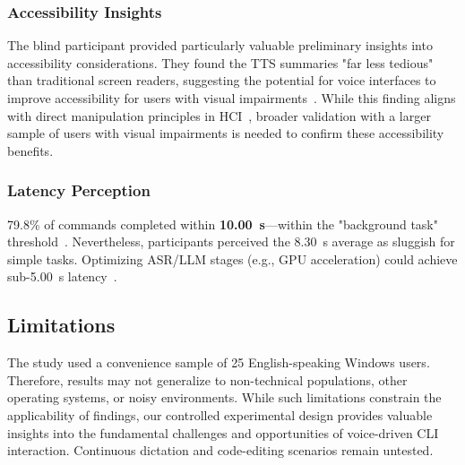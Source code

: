 \documentclass[a4paper,12pt]{article}
\begin{document}
\subsubsection{Accessibility Insights}  
The blind participant provided particularly valuable preliminary insights into accessibility considerations. They found the TTS summaries "far less tedious" than traditional screen readers, suggesting the potential for voice interfaces to improve accessibility for users with visual impairments~\cite{ref28}. While this finding aligns with direct manipulation principles in HCI~\cite{ref21}, broader validation with a larger sample of users with visual impairments is needed to confirm these accessibility benefits.  

\subsubsection{Latency Perception}  
79.8\% of commands completed within \textbf{10.00~s}—within the "background task" threshold~\cite{ref4}. Nevertheless, participants perceived the 8.30~s average as sluggish for simple tasks. Optimizing ASR/LLM stages (e.g., GPU acceleration) could achieve sub-5.00~s latency~\cite{ref5}.  

\subsection{Limitations}  
The study used a convenience sample of 25 English-speaking Windows users. Therefore, results may not generalize to non-technical populations, other operating systems, or noisy environments. While such limitations constrain the applicability of findings, our controlled experimental design provides valuable insights into the fundamental challenges and opportunities of voice-driven CLI interaction. Continuous dictation and code-editing scenarios remain untested.  
\end{document}
